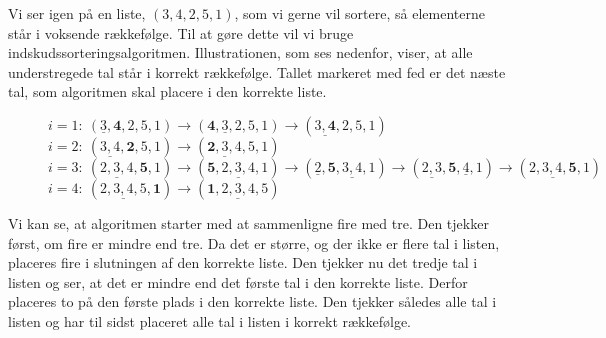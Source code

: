 \begin{exmp}
Vi ser igen på en liste, $(3,4,2,5,1)$, som vi gerne vil sortere, så elementerne står i voksende rækkefølge. Til at gøre dette vil vi bruge indskudssorteringsalgoritmen. Illustrationen, som ses nedenfor, viser, at alle understregede tal står i korrekt rækkefølge. Tallet markeret med fed er det næste tal, som algoritmen skal placere i den korrekte liste.

\begin{figure}[H]
\label{fig:indskud}
	\begin{flushleft}
	$i=1: \ (\underline{3},\textbf{4},2,5,1) \rightarrow (\textbf{4}, \underline{3},2,5,1)\rightarrow (\underline{3,\textbf{4}},2,5,1)$ \\
	$i=2: \ (\underline{3,4},\textbf{2},5,1) \rightarrow (\underline{\textbf{2},3,4},5,1) $\\
	$i=3: \ (\underline{2,3,4},\textbf{5},1) \rightarrow (\textbf{5},\underline{2,3,4},1) \rightarrow (\underline{2}, \textbf{5},\underline{3,4},1) \rightarrow (\underline{2,3}, \textbf{5}, \underline{4},1) \rightarrow (\underline{2,3,4,\textbf{5}},1) $ \\
	$i=4: \ (\underline{2,3,4,5},\textbf{1}) \rightarrow (\underline{\textbf{1},2,3,4,5}) $\\
 	\end{flushleft}
\end{figure}

Vi kan se, at algoritmen starter med at sammenligne fire med tre. Den tjekker først, om fire er mindre end tre. Da det er større, og der ikke er flere tal i listen, placeres fire i slutningen af den korrekte liste. Den tjekker nu det tredje tal i listen og ser, at det er mindre end det første tal i den korrekte liste. Derfor placeres to på den første plads i den korrekte liste. Den tjekker således alle tal i listen og har til sidst placeret alle tal i listen i korrekt rækkefølge.


\end{exmp}